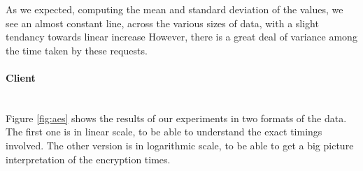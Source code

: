 
As we expected, computing the mean and standard deviation of the values, we see an almost constant line, across the various sizes of data, with a slight tendancy towards linear increase
However, there is a great deal of variance among the time taken by these requests.

\paragraph{Client} ~\\

Figure \ref{fig:aes} shows the results of our experiments in two formats of the data.
The first one is in linear scale, to be able to understand the exact timings involved.
The other version is in logarithmic scale, to be able to get a big picture interpretation of the encryption times.

